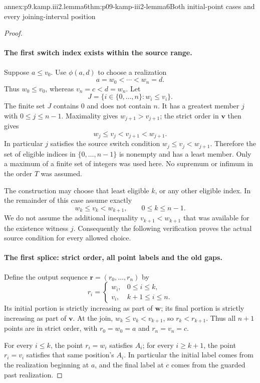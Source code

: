 \begin{annexitem}{annex:p9.kamp.iii2.lemma6}{thm:p09-kamp-iii2-lemma6}{Both initial-point cases and every joining-interval position}
\begin{proof}
\paragraph{The first switch index exists within the source range.}
Suppose \(a\leq v_0\). Use \(\phi(a,d)\) to choose a realization
\[
                           a=w_0<\cdots<w_n=d.
\]
Thus \(w_0\leq v_0\), whereas \(v_n=c<d=w_n\).
Let
\[
                    J=\{i\in\{0,\ldots,n\}:w_i\leq v_i\}.
\]
The finite set \(J\) contains 0 and does not contain \(n\).
It has a greatest member \(j\) with \(0\leq j\leq n-1\).
Maximality gives \(w_{j+1}>v_{j+1}\); the strict order in
\(\mathbf v\) then gives
\[
                     w_j\leq v_j<v_{j+1}<w_{j+1}.
\]
In particular \(j\) satisfies the source switch condition
\(w_j\leq v_j<w_{j+1}\). Therefore the set of eligible indices
in \(\{0,\ldots,n-1\}\) is nonempty and has a least member.
Only a maximum of a finite set of integers was used here.
No supremum or infimum in the order \(T\) was assumed.

The construction may choose that least eligible \(k\), or any other
eligible index. In the remainder of this case assume exactly
\[
                      w_k\leq v_k<w_{k+1},
                      \qquad 0\leq k\leq n-1.
\]
We do not assume the additional inequality
\(v_{k+1}<w_{k+1}\) that was available for the existence witness
\(j\). Consequently the following verification proves the actual
source condition for every allowed choice.

\paragraph{The first splice: strict order, all point labels and the old gaps.}
Define the output sequence \(\mathbf r=(r_0,\ldots,r_n)\) by
\[
 r_i=
 \begin{cases}
   w_i,&0\leq i\leq k,\\
   v_i,&k+1\leq i\leq n.
 \end{cases}
\]
Its initial portion is strictly increasing as part of \(\mathbf w\);
its final portion is strictly increasing as part of \(\mathbf v\).
At the join,
\(w_k\leq v_k<v_{k+1}\), so \(r_k<r_{k+1}\).
Thus all \(n+1\) points are in strict order, with
\(r_0=w_0=a\) and \(r_n=v_n=c\).

For every \(i\leq k\), the point \(r_i=w_i\) satisfies \(A_i\);
for every \(i\geq k+1\), the point \(r_i=v_i\) satisfies that
same position's \(A_i\). In particular the initial label comes from
the realization beginning at \(a\), and the final label at \(c\)
comes from the guarded past realization.


\end{proof}
\end{annexitem}
